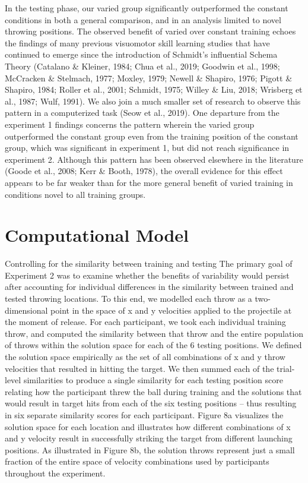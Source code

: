 \documentclass[
  jou, donotrepeattitle,floatsintext]{apa7}
\begin{document}
In the testing phase, our varied group significantly outperformed the constant conditions in both a general comparison, and in an analysis limited to novel throwing positions. The observed benefit of varied over constant training echoes the findings of many previous visuomotor skill learning studies that have continued to emerge since the introduction of Schmidt's influential Schema Theory (Catalano \& Kleiner, 1984; Chua et al., 2019; Goodwin et al., 1998; McCracken \& Stelmach, 1977; Moxley, 1979; Newell \& Shapiro, 1976; Pigott \& Shapiro, 1984; Roller et al., 2001; Schmidt, 1975; Willey \& Liu, 2018; Wrisberg et al., 1987; Wulf, 1991). We also join a much smaller set of research to observe this pattern in a computerized task (Seow et al., 2019). One departure from the experiment 1 findings concerns the pattern wherein the varied group outperformed the constant group even from the training position of the constant group, which was significant in experiment 1, but did not reach significance in experiment 2. Although this pattern has been observed elsewhere in the literature (Goode et al., 2008; Kerr \& Booth, 1978), the overall evidence for this effect appears to be far weaker than for the more general benefit of varied training in conditions novel to all training groups.

\hypertarget{computational-model}{%
\section{Computational Model}\label{computational-model}}

Controlling for the similarity between training and testing
The primary goal of Experiment 2 was to examine whether the benefits of variability would persist after accounting for individual differences in the similarity between trained and tested throwing locations. To this end, we modelled each throw as a two-dimensional point in the space of x and y velocities applied to the projectile at the moment of release. For each participant, we took each individual training throw, and computed the similarity between that throw and the entire population of throws within the solution space for each of the 6 testing positions. We defined the solution space empirically as the set of all combinations of x and y throw velocities that resulted in hitting the target. We then summed each of the trial-level similarities to produce a single similarity for each testing position score relating how the participant threw the ball during training and the solutions that would result in target hits from each of the six testing positions -- thus resulting in six separate similarity scores for each participant. Figure 8a visualizes the solution space for each location and illustrates how different combinations of x and y velocity result in successfully striking the target from different launching positions. As illustrated in Figure 8b, the solution throws represent just a small fraction of the entire space of velocity combinations used by participants throughout the experiment.
\end{document}
